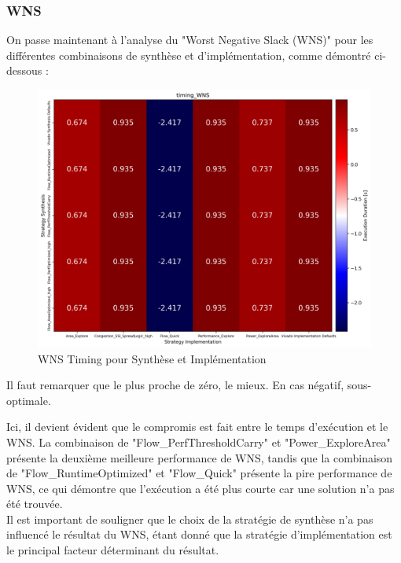 \documentclass[../CSC_5RO07_TA.tex]{subfiles}
\begin{document}
\subsubsection{WNS}
\noindent On passe maintenant à l'analyse du "Worst Negative Slack (WNS)" pour les différentes combinaisons de synthèse et d'implémentation, comme démontré ci-dessous :
\begin{figure}[H]
	\centering
	\includegraphics[width=0.5\linewidth]{images/2_timing_WNS.png}
	\caption{WNS Timing pour Synthèse et Implémentation}
	\label{fig:wns_2}
\end{figure}
\begin{remark}
    Il faut remarquer que le plus proche de zéro, le mieux. En cas négatif, sous-optimale.
\end{remark}
\noindent Ici, il devient évident que le compromis est fait entre le temps d'exécution et le WNS. La combinaison de "Flow\_PerfThresholdCarry" et "Power\_ExploreArea" présente la deuxième meilleure performance de WNS, tandis que la combinaison de "Flow\_RuntimeOptimized" et "Flow\_Quick" présente la pire performance de WNS, ce qui démontre que l'exécution a été plus courte car une solution n'a pas été trouvée.\\

\noindent Il est important de souligner que le choix de la stratégie de synthèse n'a pas influencé le résultat du WNS, étant donné que la stratégie d'implémentation est le principal facteur déterminant du résultat.
\end{document}
